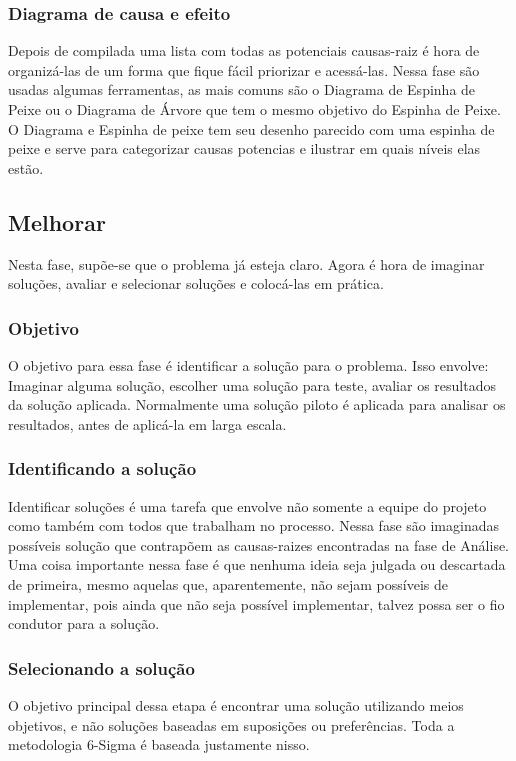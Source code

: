 \documentclass{abnt}
\begin{document}
					\subsubsection {Diagrama de causa e efeito}
					Depois de compilada uma lista com todas as potenciais causas-raiz é hora de organizá-las de um forma que fique 
					fácil priorizar e acessá-las.
					Nessa fase são usadas algumas ferramentas, as mais comuns são o Diagrama de Espinha de Peixe ou o Diagrama de Árvore 
					que tem o mesmo objetivo do Espinha de Peixe.\\
					O Diagrama e Espinha de peixe tem seu desenho parecido com uma espinha de peixe e serve para 
					categorizar causas potencias e ilustrar em quais níveis elas estão.
				\subsection {Melhorar}
				Nesta fase, supõe-se que o problema já esteja claro. Agora é hora de imaginar soluções, avaliar e 
				selecionar soluções e colocá-las em prática.
					\subsubsection {Objetivo}
					O objetivo para essa fase é identificar a solução para o problema. Isso envolve: 
					Imaginar alguma solução, escolher uma solução para teste, avaliar os resultados da solução aplicada.
					Normalmente uma solução piloto é aplicada para analisar os resultados, antes de aplicá-la em larga escala.
					\subsubsection {Identificando a solução}
					Identificar soluções é uma tarefa que envolve não somente a equipe do projeto como também com todos que trabalham no processo. 
					Nessa fase são imaginadas possíveis solução que contrapõem as causas-raizes encontradas na fase de Análise.
					Uma coisa importante nessa fase é que nenhuma ideia seja julgada ou descartada de primeira, mesmo aquelas que, aparentemente, não sejam 
					possíveis de implementar, pois ainda que não seja possível implementar, talvez possa ser o fio condutor para a solução.
					\subsubsection {Selecionando a solução}
					O objetivo principal dessa etapa é encontrar uma solução utilizando meios objetivos, e não soluções 
					baseadas em suposições ou preferências. Toda a metodologia 6-Sigma é baseada justamente nisso.
\end{document}
